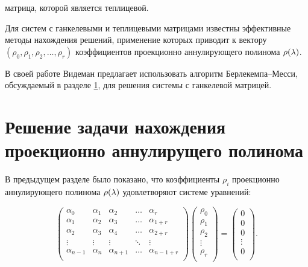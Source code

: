 матрица, которой является теплицевой.

Для систем с ганкелевыми и теплицевыми матрицами известны эффективные методы нахождения решений, применение которых приводит к вектору
$( \rho_0, \rho_1, \rho_2, \ldots, \rho_r )$ коэффициентов проекционно аннулирующего полинома $\rho (\lambda)$.

В своей работе \cite{Wiedemann} Видеман предлагает использовать алгоритм Берлекемпа--Месси, обсуждаемый в разделе
\ref{section:FPAP:finding_projection_annihilating_polynomials}, для решения системы с ганкелевой матрицей.

\section{Решение задачи нахождения проекционно аннулирущего полинома} \label{section:FPAP:finding_projection_annihilating_polynomials}

В предыдущем разделе было показано, что коэффициенты $\rho_i$ проекционно аннулирующего полинома $\rho (\lambda)$ удовлетворяют системе
уравнений:

	\begin{equation} \label{equation:FPAP:equations_for_rho}
		\begin{pmatrix}
			\alpha_0     & \alpha_1 & \alpha_2     & \ldots & \alpha_r \\
			\alpha_1     & \alpha_2 & \alpha_3     & \ldots & \alpha_{1+r} \\
			\alpha_2     & \alpha_3 & \alpha_4     & \ldots & \alpha_{2+r} \\
			\vdots       & \vdots   & \vdots       & \ddots & \vdots \\
			\alpha_{n-1} & \alpha_n & \alpha_{n+1} & \ldots & \alpha_{n-1+r} \\
		\end{pmatrix}
		\begin{pmatrix}
			\rho_0 \\
			\rho_1 \\
			\rho_2 \\
			\vdots \\
			\rho_r \\
		\end{pmatrix}
		=
		\begin{pmatrix}
			0 \\
			0 \\
			0 \\
			\vdots \\
			0 \\
		\end{pmatrix}
		.
	\end{equation}

